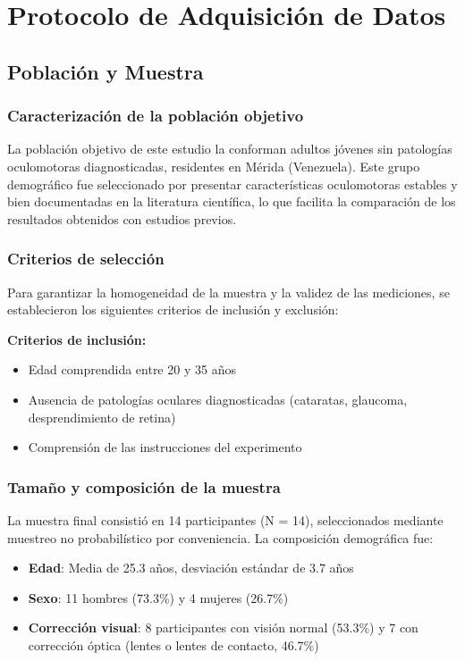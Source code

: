 \section{Protocolo de Adquisición de Datos}

\subsection{Población y Muestra}

\subsubsection{Caracterización de la población objetivo}

La población objetivo de este estudio la conforman adultos jóvenes sin patologías oculomotoras diagnosticadas, residentes en Mérida (Venezuela).
Este grupo demográfico fue seleccionado por presentar características oculomotoras estables y bien documentadas en la literatura científica, lo que facilita la comparación de los resultados obtenidos con estudios previos.

\subsubsection{Criterios de selección}

Para garantizar la homogeneidad de la muestra y la validez de las mediciones, se establecieron los siguientes criterios de inclusión y exclusión:

\textbf{Criterios de inclusión:}
\begin{itemize}
	\item Edad comprendida entre 20 y 35 años
	\item Ausencia de patologías oculares diagnosticadas (cataratas, glaucoma, desprendimiento de retina)
	\item Comprensión de las instrucciones del experimento
\end{itemize}

\subsubsection{Tamaño y composición de la muestra}

La muestra final consistió en 14 participantes (N = 14), seleccionados mediante muestreo no probabilístico por conveniencia.
La composición demográfica fue:

\begin{itemize}
	\item \textbf{Edad}: Media de 25.3 años, desviación estándar de 3.7 años
	\item \textbf{Sexo}: 11 hombres (73.3\%) y 4 mujeres (26.7\%)
	\item \textbf{Corrección visual}: 8 participantes con visión normal (53.3\%) y 7 con corrección óptica (lentes o lentes de contacto, 46.7\%)
\end{itemize}

